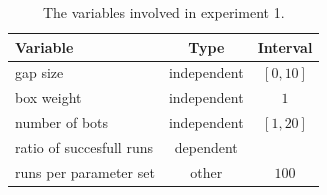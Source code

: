 \begin{table}
 \caption{The variables involved in experiment 1.}
 \begin{center}
  \begin{tabular}{| p{5cm} | c | c |}
   \hline
   \centering \textbf{Variable} & \textbf{Type} & \textbf{Interval} \\ \hline
   gap size & independent & $[0, 10]$ \\ \hline
   box weight & independent & $1$ \\ \hline
   number of bots & independent & $[1, 20]$ \\ \hline
   ratio of succesfull runs & dependent &  \\ \hline
   runs per parameter set & other & $100$ \\ \hline
  \end{tabular}
 \end{center}
 \label{tbl:exp1}
\end{table}
